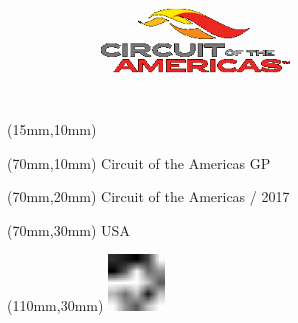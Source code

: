 \null\newpage
\begin{textblock*}{50mm}(15mm,10mm)%
\includegraphics[width=50mm]{LG/CIR.png}
\end{textblock*}
\begin{textblock*}{130mm}(70mm,10mm)%
{\fontsize{20}{20}\selectfont Circuit of the Americas GP}\\
\end{textblock*}
\begin{textblock*}{120mm}(70mm,20mm)%
{\fontsize{16}{16}\selectfont Circuit of the Americas / 2017}\\
\end{textblock*}
\begin{textblock*}{120mm}(70mm,30mm)%
{\fontsize{12}{12}\selectfont USA}
\end{textblock*}
\begin{textblock*}{30mm}(110mm,30mm)%
\centering
\includegraphics[height=15mm]{icons/fa-rotate-left.pdf}
\end{textblock*}
